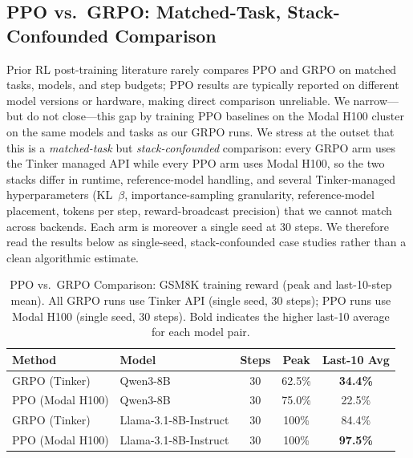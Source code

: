 \documentclass{article}
\begin{document}
\subsection{PPO vs.~GRPO: Matched-Task, Stack-Confounded Comparison}
\label{sec:ppo_grpo}

Prior RL post-training literature rarely compares PPO and GRPO on matched tasks,
models, and step budgets; PPO results are typically reported on different model
versions or hardware, making direct comparison unreliable. We narrow---but do
not close---this gap by training PPO baselines on the Modal H100 cluster on the
same models and tasks as our GRPO runs. We stress at the outset that this is a
\emph{matched-task} but \emph{stack-confounded} comparison: every GRPO arm uses
the Tinker managed API while every PPO arm uses Modal H100, so the two stacks
differ in runtime, reference-model handling, and several Tinker-managed
hyperparameters (KL~$\beta$, importance-sampling granularity, reference-model
placement, tokens per step, reward-broadcast precision) that we cannot match
across backends. Each arm is moreover a single seed at 30 steps. We therefore
read the results below as single-seed, stack-confounded case studies rather than
a clean algorithmic estimate.

\begin{table}[htbp]
\centering
\caption{PPO vs.~GRPO Comparison: GSM8K training reward (peak and last-10-step mean).
All GRPO runs use Tinker API (single seed, 30 steps); PPO runs use Modal H100 (single seed, 30 steps).
Bold indicates the higher last-10 average for each model pair.}
\label{tab:ppo_grpo}
\begin{tabular}{llccc}
\toprule
\textbf{Method} & \textbf{Model} & \textbf{Steps} & \textbf{Peak} & \textbf{Last-10 Avg} \\
\midrule
GRPO (Tinker) & Qwen3-8B & 30 & 62.5\% & \textbf{34.4\%} \\
PPO (Modal H100) & Qwen3-8B & 30 & 75.0\% & 22.5\% \\
\midrule
GRPO (Tinker) & Llama-3.1-8B-Instruct & 30 & 100\% & 84.4\% \\
PPO (Modal H100) & Llama-3.1-8B-Instruct & 30 & 100\% & \textbf{97.5\%} \\
\bottomrule
\end{tabular}
\end{table}
\end{document}
